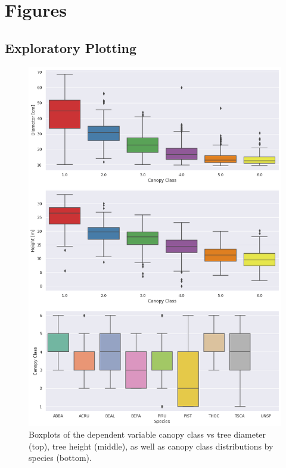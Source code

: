 \documentclass[12pt,a4paper]{article}
\begin{document}
\newpage
\section{Figures}\label{figures}

\subsection{Exploratory Plotting}

\begin{figure}[H]
\centering
\includegraphics[scale=.55]{../figures/Eplot_Boxplot_Cnpy_vs_Height&DBH.png}
\caption{Boxplots of the dependent variable canopy class vs tree diameter (top), tree height (middle), as well as canopy class distributions by species (bottom).}
\label{Eplot_Boxplot_Cnpy_vs_Height&DBH} 
\end{figure}
\end{document}

